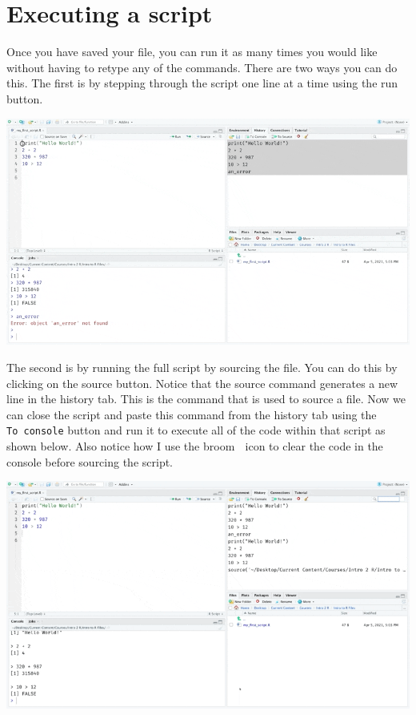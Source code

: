 \documentclass[
]{book}
\begin{document}
\hypertarget{executing-a-script}{%
\section{Executing a script}\label{executing-a-script}}

Once you have saved your file, you can run it as many times you would like without having to retype any of the commands. There are two ways you can do this. The first is by stepping through the script one line at a time using the run button.

\includegraphics{assets/ch_1-setup/gifs/run_lines.gif}

The second is by running the full script by sourcing the file. You can do this by clicking on the source button. Notice that the source command generates a new line in the history tab. This is the command that is used to source a file. Now we can close the script and paste this command from the history tab using the \texttt{To\ console} button and run it to execute all of the code within that script as shown below. Also notice how I use the broom 🧹 icon to clear the code in the console before sourcing the script.

\includegraphics{assets/ch_1-setup/gifs/run_file.gif}
\end{document}
